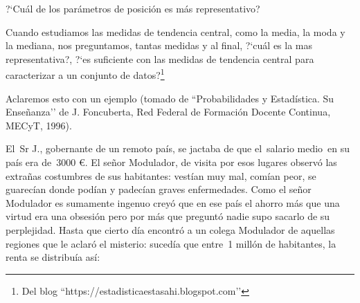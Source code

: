 \vspace{5mm}%
\begin{myexampleblock}{?`Cuál de los parámetros de posición es más representativo?}
\begin{small}

Cuando estudiamos las medidas de tendencia central, como la media, la moda y la mediana, nos preguntamos, tantas medidas y al final,  ?`cuál es la mas representativa?, ?`es suficiente con las medidas de tendencia central para caracterizar a un conjunto de datos?\footnote{Del blog  ``https://estadisticaestasahi.blogspot.com’’}


\vspace{2mm} Aclaremos esto con un ejemplo (tomado de ``Probabilidades y Estadística. Su Enseñanza’’ de J. Foncuberta, Red Federal de Formación Docente Continua, MECyT, 1996).


\vspace{2mm} El Sr J., gobernante de un remoto país, se jactaba de que el salario medio en su país era de 3000 \euro. El señor Modulador, de visita por esos lugares observó las extrañas costumbres de sus habitantes: vestían muy mal, comían peor, se guarecían donde podían y padecían graves enfermedades. Como el señor Modulador es sumamente ingenuo creyó que en ese país el ahorro más que una virtud era una obsesión pero por más que preguntó nadie supo sacarlo de su perplejidad. Hasta que cierto día encontró a un colega Modulador de aquellas regiones que le aclaró el misterio: sucedía que entre 1 millón de habitantes, la renta se distribuía así:




\end{small}
\end{myexampleblock}
